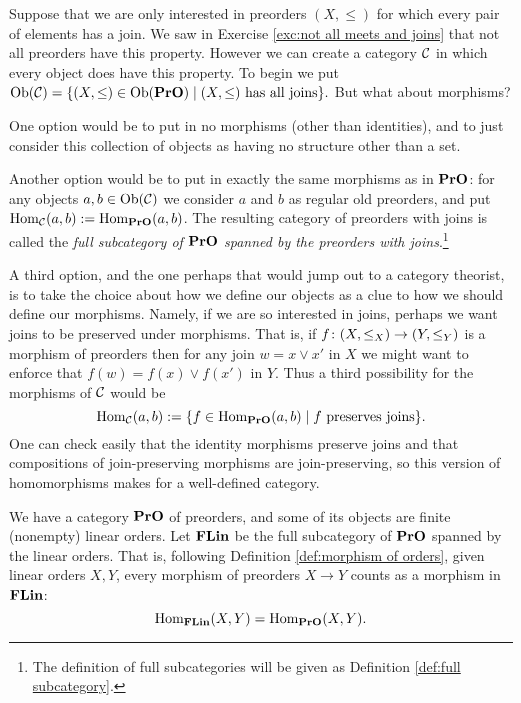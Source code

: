 \begin{example}\label{ex:preorders with joins}

Suppose that we are only interested in preorders $(X,\leq)$ for which every pair of elements has a join. We saw in Exercise \ref{exc:not all meets and joins} that not all preorders have this property. However we can create a category $\mathcal{C}$ in which every object does have this property. To begin we put $\textnormal{Ob}(\mathcal{C})=\{(X,\leq)\in\textnormal{Ob}({\bf PrO}){\;|\;} (X,\leq)\textnormal{ has all joins}\}.$ But what about morphisms?

One option would be to put in no morphisms (other than identities), and to just consider this collection of objects as having no structure other than a set.

Another option would be to put in exactly the same morphisms as in ${\bf PrO}$: for any objects $a,b\in\textnormal{Ob}(\mathcal{C})$ we consider $a$ and $b$ as regular old preorders, and put $\textnormal{Hom}_\mathcal{C}(a,b):=\textnormal{Hom}_{{\bf PrO}}(a,b)$. The resulting category of preorders with joins is called the {\em full subcategory of ${\bf PrO}$ spanned by the preorders with joins}.\footnote{The definition of full subcategories will be given as Definition \ref{def:full subcategory}.}

A third option, and the one perhaps that would jump out to a category theorist, is to take the choice about how we define our objects as a clue to how we should define our morphisms. Namely, if we are so interested in joins, perhaps we want joins to be preserved under morphisms. That is, if $f\colon (X,\leq_X)\rightarrow (Y,\leq_Y)$ is a morphism of preorders then for any join $w=x\vee x'$ in $X$ we might want to enforce that $f(w)=f(x)\vee f(x')$ in $Y$. Thus a third possibility for the morphisms of $\mathcal{C}$ would be $$\textnormal{Hom}_\mathcal{C}(a,b):=\{f\in\textnormal{Hom}_{{\bf PrO}}(a,b){\;|\;}f \textnormal{ preserves joins}\}.$$ One can check easily that the identity morphisms preserve joins and that compositions of join-preserving morphisms are join-preserving, so this version of homomorphisms makes for a well-defined category.

\end{example}

\begin{example}\label{ex:FLin}

We have a category ${\bf PrO}$ of preorders, and some of its objects are finite (nonempty) linear orders. Let ${\bf FLin}$ be the full subcategory of ${\bf PrO}$ spanned by the linear orders. That is, following Definition \ref{def:morphism of orders}, given linear orders $X,Y$, every morphism of preorders $X\to Y$ counts as a morphism in ${\bf FLin}$: $$\textnormal{Hom}_{\bf FLin}(X,Y)=\textnormal{Hom}_{\bf PrO}(X,Y).$$ 

\end{example}


